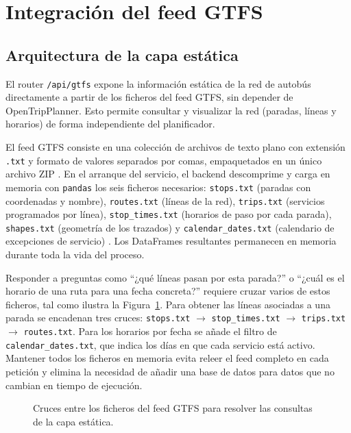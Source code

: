 \section{Integración del feed GTFS}
\label{sec:impl_gtfs}

\subsection{Arquitectura de la capa estática}
\label{subsec:impl_gtfs_arquitectura}

El router \texttt{/api/gtfs} expone la información estática de la red de autobús directamente a partir de los ficheros del feed GTFS, sin depender de OpenTripPlanner. Esto permite consultar y visualizar la red (paradas, líneas y horarios) de forma independiente del planificador.


El feed GTFS consiste en una colección de archivos de texto plano con extensión \texttt{.txt} y formato de valores separados por comas, empaquetados en un único archivo ZIP \cite{GTFSOverview}. En el arranque del servicio, el backend descomprime y carga en memoria con \texttt{pandas} los seis ficheros necesarios: \texttt{stops.txt} (paradas con coordenadas y nombre), \texttt{routes.txt} (líneas de la red), \texttt{trips.txt} (servicios programados por línea), \texttt{stop\_times.txt} (horarios de paso por cada parada), \texttt{shapes.txt} (geometría de los trazados) y \texttt{calendar\_dates.txt} (calendario de excepciones de servicio) \cite{GTFSReference}. Los DataFrames resultantes permanecen en memoria durante toda la vida del proceso.


Responder a preguntas como ``¿qué líneas pasan por esta parada?'' o ``¿cuál es el horario de una ruta para una fecha concreta?'' requiere cruzar varios de estos ficheros, tal como ilustra la Figura~\ref{fig:gtfs_joins}. Para obtener las líneas asociadas a una parada se encadenan tres cruces: \texttt{stops.txt} $\to$ \texttt{stop\_times.txt} $\to$ \texttt{trips.txt} $\to$ \texttt{routes.txt}. Para los horarios por fecha se añade el filtro de \texttt{calendar\_dates.txt}, que indica los días en que cada servicio está activo. Mantener todos los ficheros en memoria evita releer el feed completo en cada petición y elimina la necesidad de añadir una base de datos para datos que no cambian en tiempo de ejecución.

\begin{figure}[htbp]
  \centering
  \caption{Cruces entre los ficheros del feed GTFS para resolver las consultas de la capa estática.}
  \label{fig:gtfs_joins}
\end{figure}

